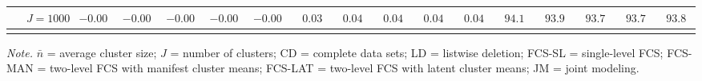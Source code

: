 \begin{sidewaystable}
\begin{threeparttable}
\begin{tabular}{llccccccccccccccc}
 & \nopagebreak $\;J=1000$  & ${-}0.00\phantom{0}$ & ${-}0.00\phantom{0}$ & ${-}0.00\phantom{0}$ & ${-}0.00\phantom{0}$ & ${-}0.00\phantom{0}$ & $\phantom{0}0.03\phantom{0}$ & $\phantom{0}0.04\phantom{0}$ & $\phantom{0}0.04\phantom{0}$ & $\phantom{0}0.04\phantom{0}$ & $\phantom{0}0.04\phantom{0}$ & $\phantom{0}94.1\phantom{0}$ & $\phantom{0}93.9\phantom{0}$ & $\phantom{0}93.7\phantom{0}$ & $\phantom{0}93.7\phantom{0}$ & $\phantom{0}93.8\phantom{0}$ \\
[0.5ex]\hline\\[-1.6ex] 
\end{tabular}
\begin{tablenotes}{\footnotesize \textit{Note.} $\bar{n}$ = average cluster size; $J$ = number of clusters; CD = complete data sets; LD = listwise deletion; FCS-SL = single-level FCS; FCS-MAN = two-level FCS with manifest cluster means; FCS-LAT = two-level FCS with latent cluster means; JM = joint modeling.}\end{tablenotes}
\end{threeparttable}
\end{sidewaystable}
